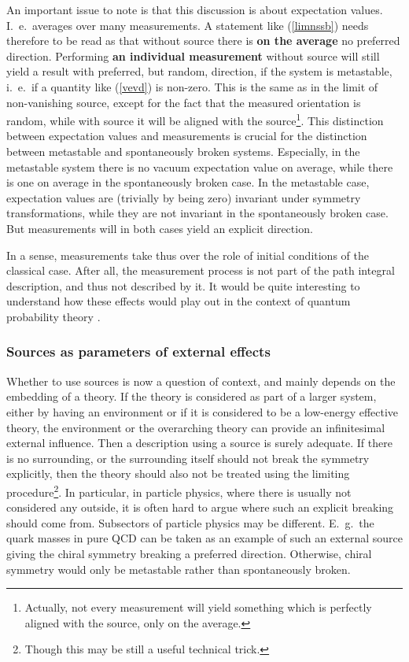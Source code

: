 \documentclass[final,12pt]{article}
\newcommand*{\pref}[1]{(\ref{#1})}
\newcommand*{\1}{1\!\!\!\bot}
\begin{document}
An important issue to note is that this discussion is about expectation values. I.\ e.\ averages over many measurements. A statement like \pref{limnssb} needs therefore to be read as that without source there is {\bf on the average} no preferred direction. Performing {\bf an individual measurement} without source will still yield a result with preferred, but random, direction, if the system is metastable, i.\ e.\ if a quantity like \pref{vevd} is non-zero. This is the same as in the limit of non-vanishing source, except for the fact that the measured orientation is random, while with source it will be aligned with the source\footnote{Actually, not every measurement will yield something which is perfectly aligned with the source, only on the average.}. This distinction between expectation values and measurements is crucial for the distinction between metastable and spontaneously broken systems. Especially, in the metastable system there is no vacuum expectation value on average, while there is one on average in the spontaneously broken case. In the metastable case, expectation values are (trivially by being zero) invariant under symmetry transformations, while they are not invariant in the spontaneously broken case. But measurements will in both cases yield an explicit direction.

In a sense, measurements take thus over the role of initial conditions of the classical case. After all, the measurement process is not part of the path integral description, and thus not described by it. It would be quite interesting to understand how these effects would play out in the context of quantum probability theory \cite{Frohlich:2015qpt}.

\subsubsection{Sources as parameters of external effects}

Whether to use sources is now a question of context, and mainly depends on the embedding of a theory. If the theory is considered as part of a larger system, either by having an environment or if it is considered to be a low-energy effective theory, the environment or the overarching theory can provide an infinitesimal external influence. Then a description using a source is surely adequate. If there is no surrounding, or the surrounding itself should not break the symmetry explicitly, then the theory should also not be treated using the limiting procedure\footnote{Though this may be still a useful technical trick.}. In particular, in particle physics, where there is usually not considered any outside, it is often hard to argue where such an explicit breaking should come from. Subsectors of particle physics may be different. E.\ g.\ the quark masses in pure QCD can be taken as an example of such an external source giving the chiral symmetry breaking a preferred direction. Otherwise, chiral symmetry would only be metastable rather than spontaneously broken.
\end{document}
